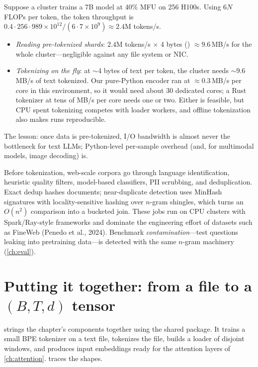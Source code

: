 \begin{napkinmath}
Suppose a cluster trains a 7B model at 40\% MFU on 256 H100s. Using $6N$ FLOPs per token, the token
throughput is $0.4\cdot 256\cdot 989\times10^{12}/(6\cdot 7\times10^9)\approx 2.4$M tokens/s.
\begin{itemize}
  \item \emph{Reading pre-tokenized shards}: $2.4$M tokens/s $\times$ 4 bytes () $\approx 9.6$\,MB/s
  for the whole cluster---negligible against any file system or NIC.
  \item \emph{Tokenizing on the fly}: at $\sim$4 bytes of text per token, the cluster needs
  $\sim$9.6\,MB/s of text tokenized. Our pure-Python encoder ran at $\approx 0.3$\,MB/s per core in
  this environment, so it would need about 30 dedicated cores; a Rust tokenizer at tens of MB/s per
  core needs one or two. Either is feasible, but CPU spent tokenizing competes with loader workers,
  and offline tokenization also makes runs reproducible.
\end{itemize}
The lesson: once data is pre-tokenized, I/O bandwidth is almost never the bottleneck for text
LLMs; Python-level per-sample overhead (and, for multimodal models, image decoding) is.
\end{napkinmath}

\begin{deepdive}
Before tokenization, web-scale corpora go through language identification, heuristic quality
filters, model-based classifiers, PII scrubbing, and deduplication. Exact dedup hashes documents;
near-duplicate detection uses MinHash signatures with locality-sensitive hashing over $n$-gram
shingles, which turns an $O(n^2)$ comparison into a bucketed join. These jobs run on CPU clusters
with Spark/Ray-style frameworks and dominate the engineering effort of datasets such as
FineWeb (Penedo et al., 2024). Benchmark \emph{contamination}---test questions leaking into
pretraining data---is detected with the same $n$-gram machinery (\cref{ch:eval}).
\end{deepdive}


\section{Putting it together: from a file to a $(B,T,d)$ tensor}\label{sec:text:e2e}

 strings the chapter's components together using the shared 
package. It trains a small BPE tokenizer on a text file, tokenizes the file, builds a loader of
disjoint windows, and produces input embeddings ready for the attention layers of
\cref{ch:attention}.  traces the shapes.

